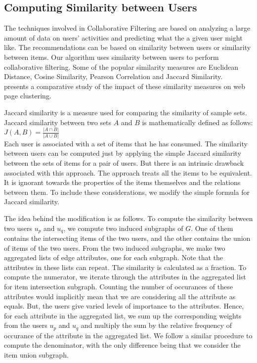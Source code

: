 \documentclass{acm_proc_article-sp}
\begin{document}

\subsection{Computing Similarity between Users}
\label{sec:userSimilarity}

The techniques involved in Collaborative Filtering are based on analyzing a large amount of data on users' activities and predicting what the a given user might like. The recommendations can be based on similarity between users or similarity between items. Our algorithm uses similarity between users to perform collaborative filtering. Some of the popular similarity measures are Euclidean Distance, Cosine Similarity, Pearson Correlation and Jaccard Similarity. ~\cite{alexander} presents a comparative study of the impact of these similarity measures on web page clustering.

Jaccard similarity is a measure used for comparing the similarity of sample sets. Jaccard similarity between two sets $A$ and $B$ is mathematically defined as follows:\\
$J(A,B) = \frac{|A \cap B|}{|A \cup B|}$\\
Each user is associated with a set of items that he has consumed. The similarity between users can be computed just by applying the simple Jaccard similarity between the sets of items for a pair of users. But there is an intrinsic drawback associated with this approach. The approach treats all the items to be equivalent. It is ignorant towards the properties of the items themselves and the relations between them. To include these considerations, we modify the simple formula for Jaccard similarity.

The idea behind the modification is as follows. To compute the similarity between two users $u_p$ and $u_q$, we compute two induced subgraphs of $G$. One of them contains the intersecting items of the two users, and the other contains the union of items of the two users. From the two induced subgraphs, we make two aggregated lists of edge attributes, one for each subgraph. Note that the attributes in these lists can repeat. The similarity is calculated as a fraction. To compute the numerator, we iterate  through the attributes in the aggregated list for item intersection subgraph. Counting the number of occurances of these attributes would implicitly mean that we are considering all the attribute as equals. But, the users give varied levels of importance to the attributes. Hence, for each attribute in the aggregated list, we sum up the corresponding weights from the users $u_p$ and $u_q$ and multiply the sum by the relative frequency of occurance of the attribute in the aggregated list. We follow a similar 
procedure to compute the denominator, with the only difference being that we consider the item union subgraph.
\end{document}
